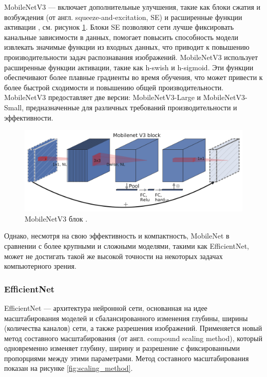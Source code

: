 \documentclass[a4paper,12pt]{extarticle}
\begin{document}
MobileNetV3 — включает дополнительные улучшения, такие как блоки сжатия и возбуждения (от англ. squeeze-and-excitation, SE) и расширенные функции активации \cite{mobilenetv3},  см. рисунок  \ref{fig:mobilenetv3}. Блоки SE позволяют сети лучше фиксировать канальные зависимости в данных, помогает повысить способность модели извлекать значимые функции из входных данных, что приводит к повышению производительности задач распознавания изображений. MobileNetV3 использует расширенные функции активации, такие как h-swish и h-sigmoid. Эти функции обеспечивают более плавные градиенты во время обучения, что может привести к более быстрой сходимости и повышению общей производительности. MobileNetV3 предоставляет две версии: MobileNetV3-Large и MobileNetV3-Small, предназначенные для различных требований производительности и эффективности.

\begin{figure}[ht]
	\centering
	\includegraphics[scale=0.2]{mobilenet-v3-block.png}
	\caption{MobileNetV3 блок \cite{mobilenetv3}.}
	\label{fig:mobilenetv3}
\end{figure}

Однако, несмотря на свою эффективность и компактность, MobileNet в сравнении с более крупными и сложными моделями, такими как EfficientNet, может не достигать такой же высокой точности на некоторых задачах компьютерного зрения.

\subsubsection{EfficientNet}

EfficientNet — архитектура нейронной сети, основанная на идее масштабирования моделей и сбалансированного изменения глубины, ширины (количества каналов) сети, а также разрешения изображений\cite{efficientnet}. Применяется новый метод составного масштабирования (от англ. compound scaling method), который одновременно изменяет глубину, ширину и разрешение с фиксированными пропорциями между этими параметрами. Метод составного масштабирования показан на рисунке \ref{fig:scaling_method}.
\end{document}
